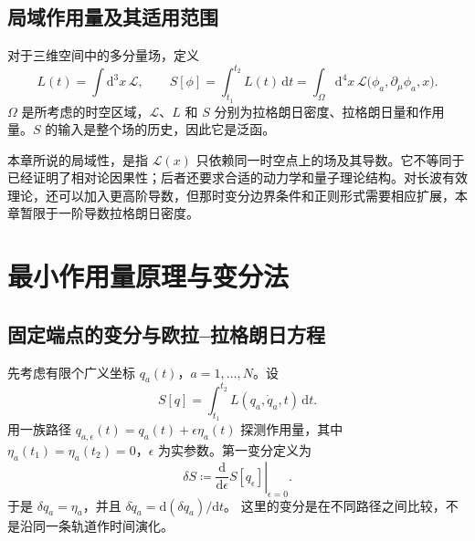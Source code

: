 \subsection{局域作用量及其适用范围}

对于三维空间中的多分量场，定义
\begin{equation}
  L(t)=\int\mathrm{d}^{3}x\,\mathcal{L},\qquad
  S[\phi]=\int_{t_{1}}^{t_{2}}L(t)\,\mathrm{d}t
  =\int_{\Omega}\mathrm{d}^{4}x\,
  \mathcal{L}\bigl(\phi_{a},\partial_{\mu}\phi_{a},x\bigr).
  \label{eq:prelude-action}
\end{equation}
$\Omega$ 是所考虑的时空区域，$\mathcal{L}$、$L$ 和 $S$ 分别为拉格朗日密度、拉格朗日量和作用量。$S$ 的输入是整个场的历史，因此它是泛函。

本章所说的局域性，是指 $\mathcal{L}(x)$ 只依赖同一时空点上的场及其导数。它不等同于已经证明了相对论因果性；后者还要求合适的动力学和量子理论结构。对长波有效理论，还可以加入更高阶导数，但那时变分边界条件和正则形式需要相应扩展，本章暂限于一阶导数拉格朗日密度。

\section{最小作用量原理与变分法}
\label{sec:prelude-variation}

\subsection{固定端点的变分与欧拉--拉格朗日方程}

先考虑有限个广义坐标 $q_{a}(t)$，$a=1,\ldots,N$。设
\begin{equation}
  S[q]=\int_{t_{1}}^{t_{2}}L(q_{a},\dot q_{a},t)\,\mathrm{d}t.
\end{equation}
用一族路径 $q_{a,\epsilon}(t)=q_{a}(t)+\epsilon\eta_{a}(t)$ 探测作用量，其中
$\eta_{a}(t_{1})=\eta_{a}(t_{2})=0$，$\epsilon$ 为实参数。第一变分定义为
\begin{equation}
  \delta S\coloneqq
  \left.\frac{\mathrm{d}}{\mathrm{d}\epsilon}S[q_{\epsilon}]\right|_{\epsilon=0}.
\end{equation}
于是 $\delta q_{a}=\eta_{a}$，并且
$\delta\dot q_{a}=\mathrm{d}(\delta q_{a})/\mathrm{d}t$。
这里的变分是在不同路径之间比较，不是沿同一条轨道作时间演化。

